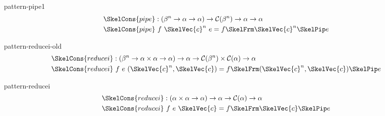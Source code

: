 \documentclass[preview]{standalone}
\begin{document}
\begin{docimage}{pattern-pipe1}
  \begin{align*}%
    \SkelCons{pipe} &: (\beta^n \rightarrow \alpha \rightarrow \alpha)
                      \rightarrow \mathcal{C}(\beta^n) \rightarrow \alpha \rightarrow \alpha \\
    \SkelCons{pipe} &\ f\ \SkelVec{c}^n\ e = f \SkelFrm \SkelVec{c}^n \SkelPip e
  \end{align*}
\end{docimage}

\begin{docimage}{pattern-reducei-old}
  \begin{align*}%
    \SkelCons{reducei} &: (\beta^n \rightarrow \alpha \times \alpha \rightarrow \alpha)
                      \rightarrow \alpha \rightarrow \mathcal{C}(\beta^n) \times  \mathcal{C}(\alpha) \rightarrow \alpha \\
    \SkelCons{reducei} &\ f\ e\ (\SkelVec{c}^n, \SkelVec{c}) = f \SkelFrm (\SkelVec{c}^n, \SkelVec{c}) \SkelPip e
  \end{align*}
\end{docimage}

\begin{docimage}{pattern-reducei}
  \begin{align*}%
    \SkelCons{reducei} &: (\alpha \times \alpha \rightarrow \alpha)
                      \rightarrow \alpha \rightarrow \mathcal{C}(\alpha) \rightarrow \alpha \\
    \SkelCons{reducei} &\ f\ e\ \SkelVec{c} = f \SkelFrm \SkelVec{c} \SkelPip e
  \end{align*}
\end{docimage}
\end{document}
